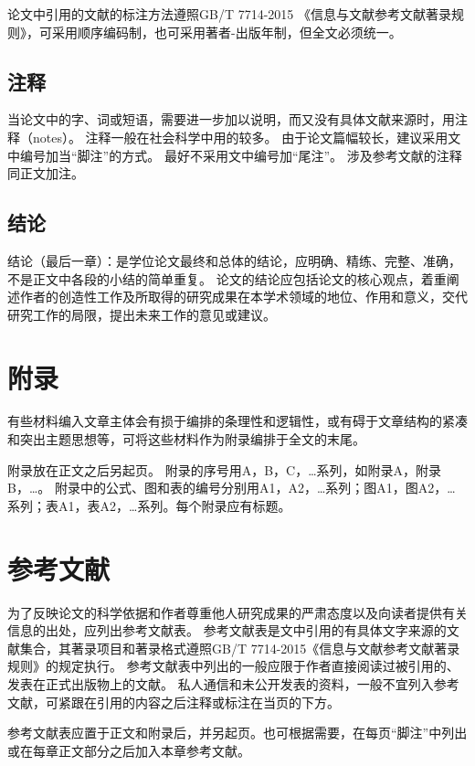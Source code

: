 论文中引用的文献的标注方法遵照GB/T 7714-2015 《信息与文献参考文献著录规则》，可采用顺序编码制，也可采用著者-出版年制，但全文必须统一。

\subsection{注释}

当论文中的字、词或短语，需要进一步加以说明，而又没有具体文献来源时，用注释（notes）。
注释一般在社会科学中用的较多。
由于论文篇幅较长，建议采用文中编号加当“脚注”的方式。
最好不采用文中编号加“尾注”。
涉及参考文献的注释同正文加注。

\subsection{结论}

结论（最后一章）：是学位论文最终和总体的结论，应明确、精练、完整、准确，不是正文中各段的小结的简单重复。
论文的结论应包括论文的核心观点，着重阐述作者的创造性工作及所取得的研究成果在本学术领域的地位、作用和意义，交代研究工作的局限，提出未来工作的意见或建议。

\section{附录}

有些材料编入文章主体会有损于编排的条理性和逻辑性，或有碍于文章结构的紧凑和突出主题思想等，可将这些材料作为附录编排于全文的末尾。

附录放在正文之后另起页。
附录的序号用A，B，C，…系列，如附录A，附录B，…。
附录中的公式、图和表的编号分别用A1，A2，…系列；图A1，图A2，…系列；表A1，表A2，…系列。每个附录应有标题。

\section{参考文献}

为了反映论文的科学依据和作者尊重他人研究成果的严肃态度以及向读者提供有关信息的出处，应列出参考文献表。
参考文献表是文中引用的有具体文字来源的文献集合，其著录项目和著录格式遵照GB/T 7714-2015《信息与文献参考文献著录规则》的规定执行。
参考文献表中列出的一般应限于作者直接阅读过被引用的、发表在正式出版物上的文献。
私人通信和未公开发表的资料，一般不宜列入参考文献，可紧跟在引用的内容之后注释或标注在当页的下方。

参考文献表应置于正文和附录后，并另起页。也可根据需要，在每页“脚注”中列出或在每章正文部分之后加入本章参考文献。

